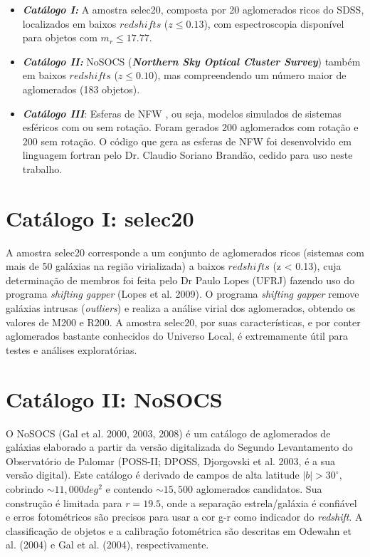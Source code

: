 \begin{itemize}
   \item \textit{\textbf{Catálogo I: }} A amostra selec20, composta por 20 aglomerados ricos do SDSS, localizados em baixos $redshifts$ ($z \leq 0.13$), com espectroscopia disponível para objetos com $m_r \leq 17.77$.
   \item \textit{\textbf{Catálogo II: }} NoSOCS (\textit{\textbf{Northern Sky Optical Cluster Survey}}) também em  baixos $redshifts$ ($z \leq 0.10$), mas compreendendo um número maior de aglomerados (183 objetos).	
   \item \textit{\textbf{Catálogo III}}: Esferas de NFW \cite{NFW1997}, ou seja, modelos simulados de sistemas esféricos com ou sem rotação. Foram gerados 200 aglomerados com rotação e 200 sem rotação. O código que gera as esferas de NFW foi desenvolvido em linguagem fortran pelo Dr. Claudio Soriano Brandão, cedido para uso neste trabalho.
 \end{itemize}  

\section{Catálogo I: selec20}
A amostra selec20  corresponde a um conjunto de aglomerados ricos (sistemas com mais de 50 galáxias na região virializada) a baixos $redshifts$ (z < 0.13), cuja determinação de membros foi feita pelo Dr Paulo Lopes (UFRJ) fazendo uso do programa \textit{shifting gapper} (Lopes et al. 2009). O programa \textit{shifting gapper} remove galáxias intrusas (\textit{outliers}) e realiza a análise virial dos aglomerados, obtendo os valores de M200 e R200. A amostra selec20, por suas características, e por conter aglomerados bastante conhecidos do Universo Local, é  extremamente útil para testes e análises exploratórias. 


\section{Catálogo II: NoSOCS}
\label{subsec:simulate}

O NoSOCS (Gal et al. 2000, 2003, 2008) é um catálogo de aglomerados de galáxias elaborado a partir da versão digitalizada do Segundo Levantamento do Observatório de Palomar (POSS-II; DPOSS, Djorgovski et al. 2003, é a sua versão digital). Este catálogo é derivado de campos de alta latitude $\vert b \vert > 30^\circ$, cobrindo $ \sim 11,000  deg^2$ e contendo $\sim 15,500$ aglomerados candidatos. Sua construção é limitada para $r = 19.5$, onde a separação estrela/galáxia é confiável e erros fotométricos são precisos para usar a cor g-r como indicador do \textit{redshift}. A classificação de objetos e a calibração fotométrica são descritas em Odewahn et al. (2004) e Gal et al. (2004), respectivamente.

